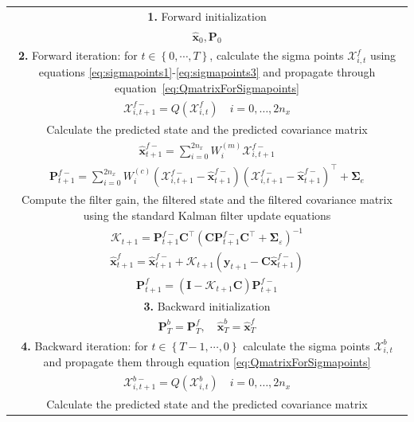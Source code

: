 \documentclass[review,authoryear,3p]{elsarticle}
\begin{document}
\begin{table}[!ht]
\begin{tabular}{|c|}\hline
\multicolumn{1}{|p{16cm}|}{\textbf{1.} Forward initialization} \\ 
$\hat{\mathbf x}_0, \mathbf P_0$ \\
\hline
\multicolumn{1}{|p{16cm}|}{\textbf{2.} Forward iteration: for $t \in \left\lbrace 0,\cdots, T\right\rbrace $, calculate the sigma points $\mathcal X_{i,t}^f$ using equations \ref{eq:sigmapoints1}-\ref{eq:sigmapoints3} and propagate through equation~\ref{eq:QmatrixForSigmapoints}} \\
$\mathcal X_{i,t+1}^{f-}=Q(\mathcal X_{i,t}^f) \quad i=0, \dots, 2n_x$\\
\multicolumn{1}{|p{16cm}|}{Calculate the predicted state and the predicted covariance matrix} \\
$\hat{\mathbf x}_{t+1}^{f-}=\sum_{i=0}^{2n_x} W_i^{(m)}\mathcal X_{i,t+1}^{f-} $ \\
$\mathbf P_{t +1}^{f-}=\sum_{i=0}^{2n_x} W_i^{(c)}(\mathcal X_{i,t+1}^{f-}-\hat{\mathbf x}_{t +1}^{f-})(\mathcal X_{i,t+1}^{f-}-\hat{\mathbf x}_{t +1}^{f-})^\top+\boldsymbol \Sigma_e$ \\ 
\multicolumn{1}{|p{16cm}|}{Compute the filter gain, the filtered state and the filtered covariance matrix using the standard Kalman filter update equations} \\
$\mathcal K_{t+1}=\mathbf P_{t +1}^{f-}\mathbf C ^\top(\mathbf C \mathbf P_{t +1}^{f-}\mathbf C ^\top+\boldsymbol \Sigma_{\varepsilon})^{-1}$ \\
$\hat{\mathbf x}_{t+1}^{f}=\hat{\mathbf x}_{t+1}^{f-}+\mathcal K_{t+1}(\mathbf y_{t+1}-\mathbf C\hat{\mathbf x}_{t +1}^{f-})$ \\
$\mathbf P_{t+1}^f=(\mathbf I - \mathcal K_{t+1}\mathbf C)\mathbf P_{t +1}^{f-}$\\ 
\hline
\multicolumn{1}{|p{16cm}|}{\textbf{3.} Backward initialization}\\
$\mathbf P_T^b= \mathbf P_T^f, \quad \hat{\mathbf x}^b_T= \hat{\mathbf x}^f_T$ \\
\hline
\multicolumn{1}{|p{16cm}|}{\textbf{4.} Backward iteration: for $t \in \left\lbrace T-1, \cdots, 0 \right\rbrace $ calculate the sigma points $\mathcal X_{i,t}^b$ and propagate them through equation \ref{eq:QmatrixForSigmapoints}}\\
$\mathcal X_{i,t+1}^{b-}=Q(\mathcal X_{i,t}^b) \quad i=0, \dots, 2n_x$\\
\multicolumn{1}{|p{16cm}|}{Calculate the predicted state and the predicted covariance matrix}\\

\end{tabular}
\end{table}
\end{document}

